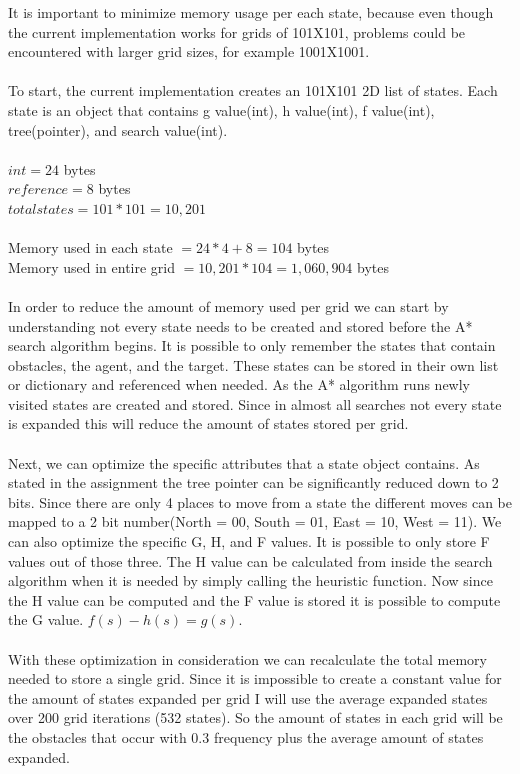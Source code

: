 \documentclass[12pt]{article}
\begin{document}
It is important to minimize memory usage per each state, because even though the current implementation works for grids of 101X101, problems could be encountered with larger grid sizes, for example 1001X1001.\\
\\
To start, the current implementation creates an 101X101 2D list of states. Each state is an object that contains g value(int), h value(int), f value(int), tree(pointer), and search value(int). \\
\\
$int = 24$ bytes\\
$reference = 8$ bytes\\
$total states = 101 * 101 = 10,201$\\
\\
Memory used in each state  $= 24 * 4 + 8 = 104$  bytes\\
Memory  used in entire grid $= 10,201 * 104 = 1,060,904$ bytes\\
\\
In order to reduce the amount of memory used per grid we can start by understanding not every state needs to be created and stored before the A* search algorithm begins. It is possible to only remember the states that contain obstacles, the agent, and the target. These states can be stored in their own list or dictionary and referenced when needed. As the A* algorithm runs newly visited states are created and stored. Since in almost all searches not every state is expanded this will reduce the amount of states stored per grid.\\
\\
Next, we can optimize the specific attributes that a state object contains. As stated in the assignment the tree pointer can be significantly reduced down to 2 bits. Since there are only 4 places to move from a state the different moves can be mapped to a 2 bit number(North = 00, South = 01, East = 10, West = 11). We can also optimize the specific G, H, and F values. It is possible to only store F values out of those three. The H value can be calculated from inside the search algorithm when it is needed by simply calling the heuristic function. Now since the H value can be computed and the F value is stored it is possible to compute the G value. $f(s) - h(s) = g(s)$.\\
\\
With these optimization in consideration we can recalculate the total memory needed to store a single grid. Since it is impossible to create a constant value for the amount of states expanded per grid I will use the average expanded states over 200 grid iterations (532 states). So the amount of states in each grid will be the obstacles that occur with 0.3 frequency plus the average amount of states expanded. \\
\end{document}
